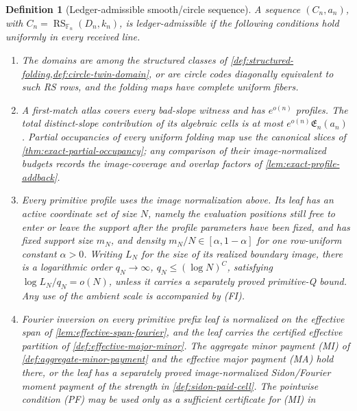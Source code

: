 \documentclass[12pt,a4paper]{amsart}
\numberwithin{equation}{section}
\newtheorem{definition}[definition]{Definition}
\theoremstyle{remark}
\DeclareMathOperator{\RS}{RS}
\newcommand{\F}{\mathbb F}
\begin{document}
\begin{definition}[Ledger-admissible smooth/circle sequence]
\label{def:admissible-sequence}
A sequence \((C_n,a_n)\), with \(C_n=\RS_{\F_n}(D_n,k_n)\), is
ledger-admissible if the following conditions hold uniformly in every
received line.
\begin{enumerate}[label=\textup{(A\arabic*)},leftmargin=*]
\item The domains are among the structured classes of
      \cref{def:structured-folding,def:circle-twin-domain}, or are circle
      codes diagonally equivalent to such RS rows, and the folding maps
      have complete uniform fibers.
\item A first-match atlas covers every bad-slope witness and has
      \(e^{o(n)}\) profiles.  The total \emph{distinct-slope} contribution
      of its algebraic cells is at most \(e^{o(n)}\mathfrak E_n(a_n)\).
      Partial occupancies of every uniform folding map use the canonical
      slices of \cref{thm:exact-partial-occupancy}; any comparison of
      their image-normalized budgets records the image-coverage and overlap
      factors of \cref{lem:exact-profile-addback}.
\item Every primitive profile uses the image normalization above.  Its
      leaf has an \emph{active coordinate set} of size \(N\), namely the
      evaluation positions still free to enter or leave the support after
      the profile parameters have been fixed, and has fixed support size
      \(m_N\), and density
      \(m_N/N\in[\alpha,1-\alpha]\) for one row-uniform constant
      \(\alpha>0\).  Writing \(L_N\) for the size of its realized boundary
      image, there is a logarithmic order \(q_N\to\infty\),
      \(q_N\le(\log N)^C\), satisfying
      \(\log L_N/q_N=o(N)\), unless it carries a separately proved
      primitive-Q bound.  Any use of the ambient scale is accompanied by
      \textup{(FI)}.
\item Fourier inversion on every primitive prefix leaf is normalized on
      the effective span of \cref{lem:effective-span-fourier}, and the
      leaf carries the certified effective partition of
      \cref{def:effective-major-minor}.  The aggregate minor payment \textup{(MI)} of
      \cref{def:aggregate-minor-payment} and the effective major payment
      \textup{(MA)} hold there, or the leaf has a separately proved
      image-normalized Sidon/Fourier moment payment of the strength in
      \cref{def:sidon-paid-cell}.  The pointwise condition \textup{(PF)}
      may be used only as a sufficient certificate for \textup{(MI)} in

\end{enumerate}
\end{definition}
\end{document}
